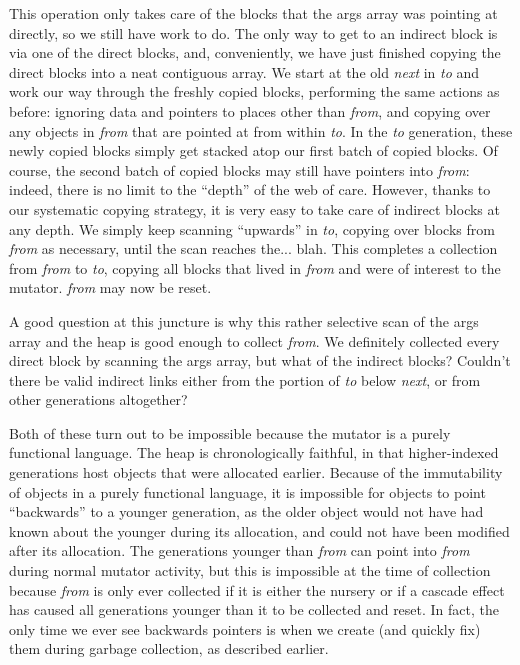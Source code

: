 This operation only takes care of the blocks that 
the args array was pointing at directly, so we still have work
to do. The only way to get to an indirect 
block is via one of the direct blocks, and, conveniently, we have
just finished copying the direct blocks into a neat contiguous
array. We start at the old \emph{next} in \emph{to}
and work our way through the freshly copied blocks, performing
the same actions as before: ignoring data and pointers to 
places other than \emph{from}, and copying over any objects in
\emph{from} that are pointed at from within \emph{to}. In
the \emph{to} generation, these newly copied blocks 
simply get stacked atop our first batch of copied blocks. 
Of course, the second batch of copied blocks may still
have pointers into \emph{from}: indeed, there is no limit to the 
``depth'' of the web of care. However, thanks to our systematic
copying strategy, it is very easy to take care of indirect
blocks at any depth. We simply keep scanning ``upwards'' in 
\emph{to}, copying over blocks from \emph{from} as necessary, 
until the scan reaches the... blah. 
This completes a collection 
from \emph{from} to \emph{to}, copying all blocks that lived
in \emph{from} and were of interest to the mutator. 
\emph{from} may now be reset.

A good question at this juncture is why this rather selective scan 
of the args array and the heap is good enough to collect \emph{from}. 
We definitely collected every direct block by scanning the args array,
but what of the indirect blocks? Couldn't there be valid indirect links
either from the portion of \emph{to} below \emph{next}, 
or from other generations altogether? 

Both of these turn out to be impossible because the mutator
is a purely functional language. The heap is chronologically
faithful, in that higher-indexed generations host
objects that were allocated earlier. Because
of the immutability of objects in a purely functional language, 
it is impossible for objects to point ``backwards'' to 
a younger generation, as the older object would not have
had known about the younger during its allocation, and could not 
have been modified after its allocation. The generations 
younger than \emph{from} can point into \emph{from} during 
normal mutator activity, but this is
impossible at the time of collection 
because \emph{from} is only ever collected if it is either
the nursery or if a cascade effect has caused all generations younger
than it to be collected and reset. 
In fact, the only time we ever see backwards pointers
is when we create (and quickly fix) them during garbage collection, 
as described earlier.

